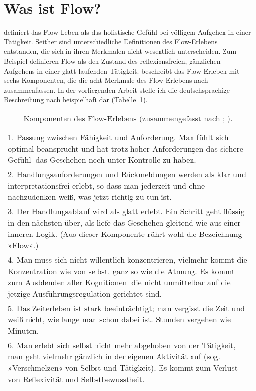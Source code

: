 

\section{Was ist Flow?} 

\label{sec:was_ist_flow}

\citet[S.~58f.]{Csikszentmihalyi2010} definiert das Flow-Leben als das holistische Gefühl bei völligem Aufgehen in einer Tätigkeit. Seither sind unterschiedliche Definitionen des Flow-Erlebens entstanden, die sich in ihren Merkmalen nicht wesentlich unterscheiden. Zum Beispiel definieren \citet[][S.~263]{Rheinberg2003} Flow als den Zustand des reflexionsfreien, gänzlichen Aufgehens in einer glatt laufenden Tätigkeit. \citep[S.~153ff.]{Rheinberg2008} beschreibt das Flow-Erleben mit sechs Komponenten, die die acht Merkmale des Flow-Erlebens nach \citet[S.~108ff.]{Csikszentmihalyi2010} zusammenfassen. In der vorliegenden Arbeit stelle ich die deutschsprachige Beschreibung nach \citep[]{Rheinberg2008} beispielhaft dar (Tabelle~\ref{tab:komponenten_des_flow_erlebens}). 
\begin{table}
	[!htb] \caption[Komponenten des Flow-Erlebens.]{Komponenten des Flow-Erlebens (zusammengefasst nach \citet{Csikszentmihalyi2010}; \citep[S.~153ff.]{Rheinberg2008}).} \label{tab:komponenten_des_flow_erlebens} 
	\begin{tabularx}
		{ 
		\textwidth}{X} \midrule 1. Passung zwischen Fähigkeit und Anforderung. Man fühlt sich optimal beansprucht und hat trotz hoher Anforderungen das sichere Gefühl, das Geschehen noch unter Kontrolle zu haben. \\
		2. Handlungsanforderungen und Rückmeldungen werden als klar und interpretationsfrei erlebt, so dass man jederzeit und ohne nachzudenken weiß, was jetzt richtig zu tun ist. \\
		3. Der Handlungsablauf wird als glatt erlebt. Ein Schritt geht flüssig in den nächsten über, als liefe das Geschehen gleitend wie aus einer inneren Logik. (Aus dieser Komponente rührt wohl die Bezeichnung »Flow«.) \\
		4. Man muss sich nicht willentlich konzentrieren, vielmehr kommt die Konzentration wie von selbst, ganz so wie die Atmung. Es kommt zum Ausblenden aller Kognitionen, die nicht unmittelbar auf die jetzige Ausführungsregulation gerichtet sind. \\
		5. Das Zeiterleben ist stark beeinträchtigt; man vergisst die Zeit und weiß nicht, wie lange man schon dabei ist. Stunden vergehen wie Minuten. \\
		6. Man erlebt sich selbst nicht mehr abgehoben von der Tätigkeit, man geht vielmehr gänzlich in der eigenen Aktivität auf (sog. »Verschmelzen« von Selbst und Tätigkeit). Es kommt zum Verlust von Reflexivität und Selbstbewusstheit. \\
		\bottomrule 
	\end{tabularx}
\end{table}
